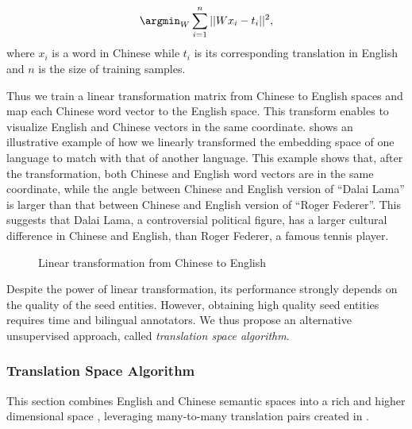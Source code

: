 \begin{equation}
\argmin_{W}\sum_{i=1}^{n} || Wx_{i}-t_{i} ||^2,
\end{equation}
where $x_{i}$ is a word in Chinese while $t_{i}$ is its
corresponding translation in English and $n$ is the size of
training samples.

Thus we train a linear transformation matrix from Chinese to English spaces and map each Chinese word vector to the English space.
This transform enables to visualize English and Chinese vectors in the same coordinate.
 shows an illustrative example
of how we linearly transformed the embedding space of one language
to match with that of another language.
This example shows that, after the transformation,
both Chinese and English word vectors are in the same coordinate,
while the angle between Chinese and English version of ``Dalai Lama''
is larger than that between Chinese and English version of ``Roger Federer''.
This suggests that Dalai Lama, a controversial political figure,
has a larger cultural difference in Chinese and English, than Roger Federer,
a famous tennis player.

\begin{figure}
	\centering
	\caption{Linear transformation from Chinese to English}
	\label{fig:embeddingspace}
\end{figure}


Despite the power of linear transformation, its performance strongly
depends on the quality of the seed entities.
However, obtaining high quality seed entities requires time and bilingual annotators.
We thus propose an alternative unsupervised approach, called \emph{translation space algorithm}.


\subsubsection{Translation Space Algorithm}

This section combines English and Chinese semantic spaces into
a rich and higher dimensional space , leveraging many-to-many translation pairs
created in .

